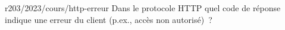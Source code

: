 \begin{question}{r203/2023/cours/http-erreur}
  Dans le protocole HTTP quel code de réponse indique une erreur du
  client (p.ex., accès non autorisé)~?
  \begin{reponses}
  \end{reponses}
\end{question}
